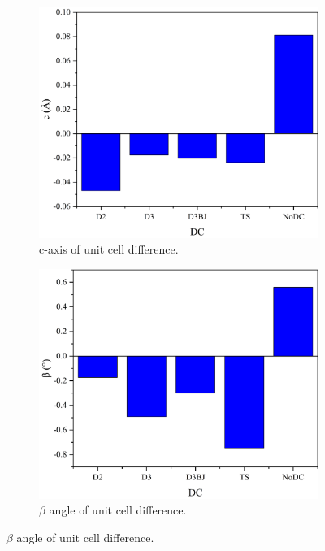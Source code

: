 \begin{figure}[!htb]
\begin{subfigure}{0.49\textwidth}
\centering
\includegraphics[width=\textwidth]{Figures/Analysis/IVDW/cchangebar.png}
\caption{c-axis of unit cell difference.}
\label{fig:StructAnal_D3BJ}
\end{subfigure}
\begin{subfigure}{0.49\textwidth}
\centering
\includegraphics[width=\textwidth]{Figures/Analysis/IVDW/betachangebar.png}
\caption{\(\beta\) angle of unit cell difference.}
\label{fig:StructAnal_TS}
\end{subfigure}


\end{figure}
